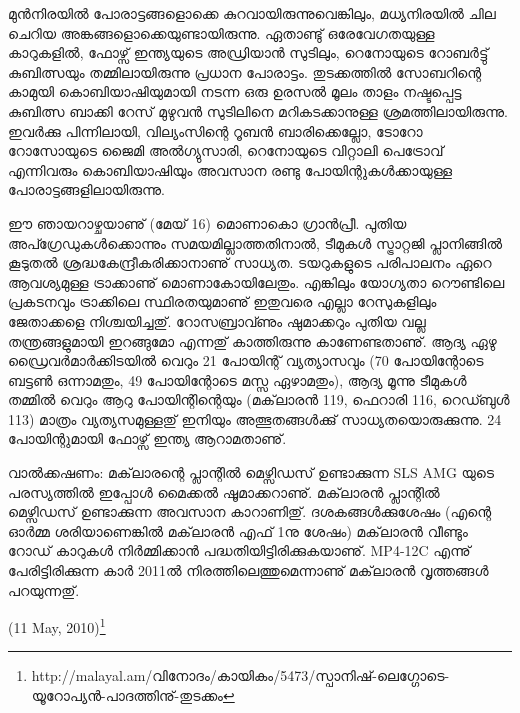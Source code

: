 മുന്‍നിരയില്‍ പോരാട്ടങ്ങളൊക്കെ കുറവായിരുന്നുവെങ്കിലും, മധ്യനിരയില്‍ ചില ചെറിയ അങ്കങ്ങളൊക്കെയുണ്ടായിരുന്നു.
ഏതാണ്ടു് ഒരേവേഗതയുള്ള കാറുകളില്‍, ഫോഴ്സ് ഇന്ത്യയുടെ അഡ്രിയാന്‍ സുടിലും, റെനോയുടെ റോബര്‍ട്ടു് കുബിത്സയും 
തമ്മിലായിരുന്നു പ്രധാന പോരാട്ടം. തുടക്കത്തില്‍ സോബറിന്റെ കാമുയി കൊബിയാഷിയുമായി നടന്ന ഒരു ഉരസല്‍ മൂലം 
താളം നഷ്ടപ്പെട്ട കുബിത്സ ബാക്കി റേസ് മുഴുവന്‍ സുടിലിനെ മറികടക്കാനുള്ള ശ്രമത്തിലായിരുന്നു. ഇവര്‍ക്കു പിന്നിലായി, 
വില്യംസിന്റെ റൂബന്‍ ബാരിക്കെല്ലോ, ടോറോ റോസോയുടെ ജൈമി അല്‍ഗ്യുസാരി, റെനോയുടെ വിറ്റാലി പെട്രോവ് 
എന്നിവരും കൊബിയാഷിയും അവസാന രണ്ടു പോയിന്റുകള്‍ക്കായുള്ള പോരാട്ടങ്ങളിലായിരുന്നു.

ഈ ഞായറാഴ്ചയാണു് (മേയ് 16) മൊണാകൊ ഗ്രാന്‍പ്രീ. പുതിയ അപ്ഗ്രേഡുകള്‍ക്കൊന്നും സമയമില്ലാത്തതിനാല്‍, 
ടീമുകള്‍ സ്ട്രാറ്റജി പ്ലാനിങ്ങില്‍ കൂടുതല്‍ ശ്രദ്ധകേന്ദ്രീകരിക്കാനാണു് സാധ്യത. ടയറുകളുടെ പരിപാലനം ഏറെ ആവശ്യമുള്ള 
ട്രാക്കാണു് മൊണാകോയിലേതും. എങ്കിലും യോഗ്യതാ റൌണ്ടിലെ പ്രകടനവും ട്രാക്കിലെ സ്ഥിരതയുമാണു് ഇതുവരെ 
എല്ലാ റേസുകളിലും ജേതാക്കളെ നിശ്ചയിച്ചതു്. റോസബ്രാവ്ണും ഷുമാക്കറും പുതിയ വല്ല തന്ത്രങ്ങളുമായി ഇറങ്ങുമോ
എന്നതു് കാത്തിരുന്നു കാണേണ്ടതാണു്. ആദ്യ ഏഴു ഡ്രൈവര്‍മാര്‍ക്കിടയില്‍ വെറും 21 പോയിന്റ് വ്യത്യാസവും 
(70 പോയിന്റോടെ ബട്ടണ്‍ ഒന്നാമതും, 49 പോയിന്റോടെ മസ്സ ഏഴാമതും), ആദ്യ മൂന്നു ടീമുകള്‍ തമ്മില്‍ വെറും ആറു 
പോയിന്റിന്റെയും (മക്‌ലാരന്‍ 119, ഫെറാരി 116, റെഡ്ബുള്‍ 113) മാത്രം വ്യത്യസമുള്ളതു് ഇനിയും അത്ഭുതങ്ങള്‍ക്കു് 
സാധ്യതയൊരുക്കുന്നു. 24 പോയിന്റുമായി ഫോഴ്സ് ഇന്ത്യ ആറാമതാണു്.

വാല്‍ക്കഷണം: മക്‌ലാരന്റെ പ്ലാന്റില്‍ മെഴ്സിഡസ് ഉണ്ടാക്കുന്ന SLS AMG യുടെ പരസ്യത്തില്‍ ഇപ്പോള്‍ മൈക്കല്‍ 
ഷൂമാക്കറാണു്. മക്‌ലാരന്‍ പ്ലാന്റില്‍ മെഴ്സിഡസ് ഉണ്ടാക്കുന്ന അവസാന കാറാണിതു്. ദശകങ്ങള്‍ക്കുശേഷം (എന്റെ 
ഓര്‍മ്മ ശരിയാണെങ്കില്‍ മക്‌ലാരന്‍ എഫ് 1നു ശേഷം) മക്‌ലാരന്‍ വീണ്ടും റോഡ് കാറുകള്‍ നിര്‍മ്മിക്കാന്‍ 
പദ്ധതിയിട്ടിരിക്കുകയാണു്. MP4-12C എന്നു് പേരിട്ടിരിക്കുന്ന കാര്‍ 2011ല്‍ നിരത്തിലെത്തുമെന്നാണു് മക്‌ലാരന്‍ 
വൃത്തങ്ങള്‍ പറയുന്നതു്.

\begin{flushright}(11 May, 2010)\footnote{http://malayal.am/വിനോദം/കായികം/5473/സ്പാനിഷ്-ലെഗ്ഗോടെ-യൂറോപ്യന്‍-പാദത്തിനു്-തുടക്കം}\end{flushright}

\newpage
